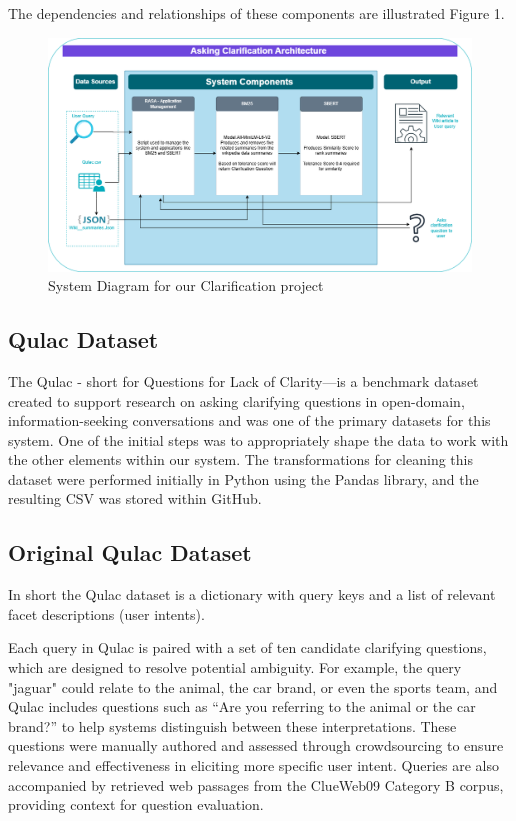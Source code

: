 \documentclass[11pt]{article}
\begin{document}
The dependencies and relationships of these components are illustrated Figure 1.

\begin{figure}[htbp]
  \includegraphics[width=\linewidth]{./img/system_diagram.png}
  \caption{System Diagram for our Clarification project}
  \label{fig:sys_diag}
\end{figure}

\subsection{Qulac Dataset}
The Qulac - short for Questions for Lack of Clarity—is a benchmark dataset created to support research on asking clarifying questions in open-domain, information-seeking conversations and was one of the primary datasets for this system. One of the initial steps was to appropriately shape the data to work with the other elements within our system. The transformations for cleaning this dataset were performed initially in Python using the Pandas library, and the resulting CSV was stored within GitHub.

\subsection{Original Qulac Dataset}
In short the Qulac dataset is a dictionary with query keys and a list of relevant facet descriptions (user intents).

Each query in Qulac is paired with a set of ten candidate clarifying questions, which are designed to resolve potential ambiguity. For example, the query "jaguar" could relate to the animal, the car brand, or even the sports team, and Qulac includes questions such as “Are you referring to the animal or the car brand?” to help systems distinguish between these interpretations. These questions were manually authored and assessed through crowdsourcing to ensure relevance and effectiveness in eliciting more specific user intent. Queries are also accompanied by retrieved web passages from the ClueWeb09 Category B corpus, providing context for question evaluation.
\end{document}
